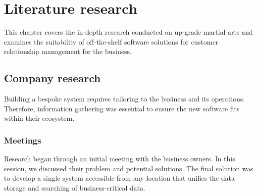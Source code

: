 \chapter{Literature research} %
\label{Chapter2} %

This chapter covers the in-depth research conducted on up-grade martial arts and examines the suitability of off-the-shelf software solutions for customer relationship management for the business.


\section{Company research}
Building a bespoke system requires tailoring to the business and its operations. Therefore, information gathering was essential to ensure the new software fits within their ecosystem. 

\subsection{Meetings}

Research began through an initial meeting with the business owners. In this session, we discussed their problem and potential solutions. The final solution was to develop a single system accessible from any location that unifies the data storage and searching of business-critical data.



